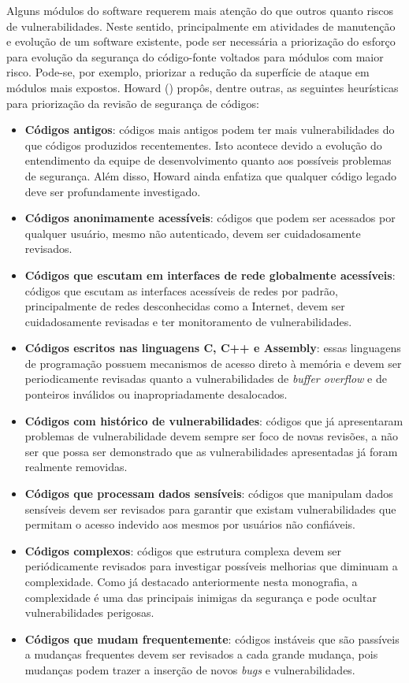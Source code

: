 %

Alguns módulos do software requerem mais atenção do que outros quanto riscos de vulnerabilidades. Neste sentido, principalmente em atividades de manutenção e evolução de um software existente, pode ser necessária a priorização do esforço para evolução da segurança do código-fonte voltados para módulos com maior risco. Pode-se, por exemplo, priorizar a redução da superfície de ataque em módulos mais expostos. Howard (\citeyear{howard2006}) propôs, dentre outras, as seguintes heurísticas para priorização da revisão de segurança de códigos:

%

\begin{itemize}
\item \textbf{Códigos antigos}: códigos mais antigos podem ter mais vulnerabilidades do que códigos produzidos recentementes. Isto acontece devido a evolução do entendimento da equipe de desenvolvimento quanto aos possíveis problemas de segurança. Além disso, Howard ainda enfatiza que qualquer código legado deve ser profundamente investigado.
\item \textbf{Códigos anonimamente acessíveis}: códigos que podem ser acessados por qualquer usuário, mesmo não autenticado, devem ser cuidadosamente revisados.
\item \textbf{Códigos que escutam em interfaces de rede globalmente acessíveis}: códigos que escutam as interfaces acessíveis de redes por padrão, principalmente de redes desconhecidas como a Internet, devem ser cuidadosamente revisadas e ter monitoramento de vulnerabilidades.
\item \textbf{Códigos escritos nas linguagens C, C++ e Assembly}: essas linguagens de programação possuem mecanismos de acesso direto à memória e devem ser periodicamente revisadas quanto a vulnerabilidades de \emph{buffer overflow} e de ponteiros inválidos ou inapropriadamente desalocados.
\item \textbf{Códigos com histórico de vulnerabilidades}: códigos que já apresentaram problemas de vulnerabilidade devem sempre ser foco de novas revisões, a não ser que possa ser demonstrado que as vulnerabilidades apresentadas já foram realmente removidas.
\item \textbf{Códigos que processam dados sensíveis}: códigos que manipulam dados sensíveis devem ser revisados para garantir que existam vulnerabilidades que permitam o acesso indevido aos mesmos por usuários não confiáveis.
\item \textbf{Códigos complexos}: códigos que estrutura complexa devem ser periódicamente revisados para investigar possíveis melhorias que diminuam a complexidade. Como já destacado anteriormente nesta monografia, a complexidade é uma das principais inimigas da segurança e pode ocultar vulnerabilidades perigosas.
\item \textbf{Códigos que mudam frequentemente}: códigos instáveis que são passíveis a mudanças frequentes devem ser revisados a cada grande mudança, pois mudanças podem trazer a inserção de novos \emph{bugs} e vulnerabilidades.
\end{itemize}

